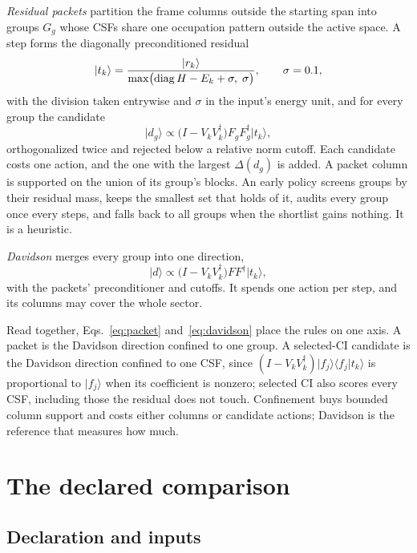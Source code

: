 \documentclass[aps,pra,reprint,superscriptaddress,nofootinbib,floatfix,
  showkeys,raggedbottom]{revtex4-2}
\newcommand{\ket}[1]{\lvert #1\rangle}
\newcommand{\bra}[1]{\langle #1\rvert}
\begin{document}
\emph{Residual packets} partition the frame columns outside the starting span
into groups $G_g$ whose CSFs share one occupation pattern outside the active
space. A step forms the diagonally preconditioned residual
\begin{equation}
\ket{t_k}=\frac{\ket{r_k}}{\max\bigl(\operatorname{diag}H-E_k+\sigma,\;\sigma\bigr)},
\qquad \sigma=\pkShift{},
\label{eq:preconditioned}
\end{equation}
with the division taken entrywise and $\sigma$ in the input's energy unit,
and for every group the candidate
\begin{equation}
\ket{d_g}\propto\bigl(I-V_kV_k^\dagger\bigr)F_gF_g^\dagger\ket{t_k},
\label{eq:packet}
\end{equation}
orthogonalized twice and rejected below a relative norm cutoff. Each
candidate costs one action, and the one with the largest $\Delta(d_g)$ is
added. A packet column is supported on the union of its group's blocks. An
early policy screens groups by their residual mass, keeps the smallest set
that holds \pkShortlistFraction{} of it, audits every group once every
\pkAuditInterval{} steps, and falls back to all groups when the shortlist
gains nothing. It is a heuristic.

\emph{Davidson} merges every group into one direction,
\begin{equation}
\ket{d}\propto\bigl(I-V_kV_k^\dagger\bigr)FF^\dagger\ket{t_k},
\label{eq:davidson}
\end{equation}
with the packets' preconditioner and cutoffs. It spends one action per step,
and its columns may cover the whole sector.

Read together, Eqs.~\eqref{eq:packet} and~\eqref{eq:davidson} place the rules
on one axis. A packet is the Davidson direction confined to one group. A
selected-CI candidate is the Davidson direction confined to one CSF, since
$(I-V_kV_k^\dagger)\ket{f_j}\bra{f_j}t_k\rangle$ is proportional to
$\ket{f_j}$ when its coefficient is nonzero; selected CI also scores every CSF,
including those the residual does not touch. Confinement buys bounded column
support and costs either columns or candidate actions; Davidson is the
reference that measures how much.

\section{The declared comparison}
\label{sec:declared}

\subsection{Declaration and inputs}
\end{document}
